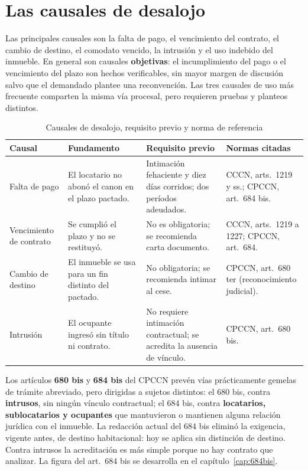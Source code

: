 \documentclass[12pt,oneside]{book}
\begin{document}
\section{Las causales de desalojo}

Las principales causales son la falta de pago, el vencimiento del contrato, el cambio de destino, el comodato vencido, la intrusión y el uso indebido del inmueble. En general son causales \textbf{objetivas}: el incumplimiento del pago o el vencimiento del plazo son hechos verificables, sin mayor margen de discusión salvo que el demandado plantee una reconvención. Las tres causales de uso más frecuente comparten la misma vía procesal, pero requieren pruebas y planteos distintos.

\begin{table}[H]
\centering
\caption{Causales de desalojo, requisito previo y norma de referencia}
\begin{tabularx}{\textwidth}{>{\raggedright\arraybackslash}p{} >{\raggedright\arraybackslash}X >{\raggedright\arraybackslash}X >{\raggedright\arraybackslash}X}
\toprule
\textbf{Causal} & \textbf{Fundamento} & \textbf{Requisito previo} & \textbf{Normas citadas} \\
\midrule
Falta de pago & El locatario no abonó el canon en el plazo pactado. & Intimación fehaciente y diez días corridos; dos períodos adeudados. & CCCN, arts.\ 1219 y ss.; CPCCN, art.\ 684 bis. \\
Vencimiento de contrato & Se cumplió el plazo y no se restituyó. & No es obligatoria; se recomienda carta documento. & CCCN, arts.\ 1219 a 1227; CPCCN, art.\ 684. \\
Cambio de destino & El inmueble se usa para un fin distinto del pactado. & No obligatoria; se recomienda intimar al cese. & CPCCN, art.\ 680 ter (reconocimiento judicial). \\
Intrusión & El ocupante ingresó sin título ni contrato. & No requiere intimación contractual; se acredita la ausencia de vínculo. & CPCCN, art.\ 680 bis. \\
\bottomrule
\end{tabularx}
\end{table}

\begin{important}
Los artículos \textbf{680 bis} y \textbf{684 bis} del CPCCN prevén vías prácticamente gemelas de trámite abreviado, pero dirigidas a sujetos distintos: el 680 bis, contra \textbf{intrusos}, sin ningún vínculo contractual; el 684 bis, contra \textbf{locatarios, sublocatarios y ocupantes} que mantuvieron o mantienen alguna relación jurídica con el inmueble. La redacción actual del 684 bis eliminó la exigencia, vigente antes, de destino habitacional: hoy se aplica sin distinción de destino. Contra intrusos la acreditación es más simple porque no hay contrato que analizar. La figura del art.\ 684 bis se desarrolla en el capítulo~\ref{cap:684bis}.
\end{important}
\end{document}

